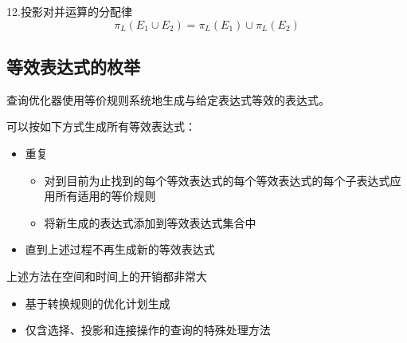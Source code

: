 \noindent 12.投影对并运算的分配律
$$\pi_L(E_1\cup E_2)=\pi_L(E_1)\cup \pi_L(E_2)$$

\subsection{等效表达式的枚举}

查询优化器使用等价规则系统地生成与给定表达式等效的表达式。

可以按如下方式生成所有等效表达式：
\begin{itemize}
    \item 重复
       \begin{itemize}
          \item 对到目前为止找到的每个等效表达式的每个等效表达式的每个子表达式应用所有适用的等价规则
          \item 将新生成的表达式添加到等效表达式集合中
       \end{itemize}
    \item 直到上述过程不再生成新的等效表达式
\end{itemize}

上述方法在空间和时间上的开销都非常大
\begin{itemize}
    \item 基于转换规则的优化计划生成
    \item 仅含选择、投影和连接操作的查询的特殊处理方法
\end{itemize}
